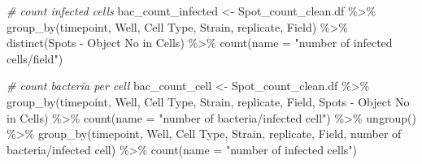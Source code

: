 \documentclass[
]{article}
\newenvironment{Shaded}{\begin{snugshade}}{\end{snugshade}}
\newcommand{\AttributeTok}[1]{\textcolor[rgb]{0.77,0.63,0.00}{#1}}
\newcommand{\CommentTok}[1]{\textcolor[rgb]{0.56,0.35,0.01}{\textit{#1}}}
\newcommand{\FunctionTok}[1]{\textcolor[rgb]{0.00,0.00,0.00}{#1}}
\newcommand{\NormalTok}[1]{#1}
\newcommand{\OtherTok}[1]{\textcolor[rgb]{0.56,0.35,0.01}{#1}}
\newcommand{\SpecialCharTok}[1]{\textcolor[rgb]{0.00,0.00,0.00}{#1}}
\newcommand{\StringTok}[1]{\textcolor[rgb]{0.31,0.60,0.02}{#1}}
\begin{document}
\begin{Shaded}
\begin{Highlighting}[]
\CommentTok{\# count infected cells}
\NormalTok{bac\_count\_infected }\OtherTok{\textless{}{-}}\NormalTok{ Spot\_count\_clean.df  }\SpecialCharTok{\%\textgreater{}\%} \FunctionTok{group\_by}\NormalTok{(timepoint,  Well, }\StringTok{\textasciigrave{}}\AttributeTok{Cell Type}\StringTok{\textasciigrave{}}\NormalTok{, Strain, replicate, Field) }\SpecialCharTok{\%\textgreater{}\%}
  \FunctionTok{distinct}\NormalTok{(}\StringTok{\textasciigrave{}}\AttributeTok{Spots {-} Object No in Cells}\StringTok{\textasciigrave{}}\NormalTok{) }\SpecialCharTok{\%\textgreater{}\%}
  \FunctionTok{count}\NormalTok{(}\AttributeTok{name =} \StringTok{"number of infected cells/field"}\NormalTok{)}


\CommentTok{\# count bacteria per cell}
\NormalTok{bac\_count\_cell }\OtherTok{\textless{}{-}}\NormalTok{ Spot\_count\_clean.df  }\SpecialCharTok{\%\textgreater{}\%} 
  \FunctionTok{group\_by}\NormalTok{(timepoint,  Well, }\StringTok{\textasciigrave{}}\AttributeTok{Cell Type}\StringTok{\textasciigrave{}}\NormalTok{, Strain, replicate, Field, }\StringTok{\textasciigrave{}}\AttributeTok{Spots {-} Object No in Cells}\StringTok{\textasciigrave{}}\NormalTok{) }\SpecialCharTok{\%\textgreater{}\%}
  \FunctionTok{count}\NormalTok{(}\AttributeTok{name =} \StringTok{"number of bacteria/infected cell"}\NormalTok{) }\SpecialCharTok{\%\textgreater{}\%}
  \FunctionTok{ungroup}\NormalTok{() }\SpecialCharTok{\%\textgreater{}\%}
  \FunctionTok{group\_by}\NormalTok{(timepoint,  Well, }\StringTok{\textasciigrave{}}\AttributeTok{Cell Type}\StringTok{\textasciigrave{}}\NormalTok{, Strain, replicate, Field, }\StringTok{\textasciigrave{}}\AttributeTok{number of bacteria/infected cell}\StringTok{\textasciigrave{}}\NormalTok{) }\SpecialCharTok{\%\textgreater{}\%}
  \FunctionTok{count}\NormalTok{(}\AttributeTok{name =} \StringTok{"number of infected cells"}\NormalTok{)}
  


\end{Highlighting}
\end{Shaded}
\end{document}
